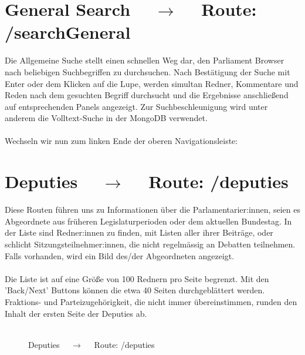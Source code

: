 \documentclass[10pt]{report}
\begin{document}
\section{General Search $\quad\rightarrow\quad$  Route:  /searchGeneral}
Die Allgemeine Suche stellt einen schnellen Weg dar, den Parliament Browser nach beliebigen Suchbegriffen zu durchsuchen. 
Nach Bestätigung der Suche mit Enter oder dem Klicken auf die Lupe, werden simultan Redner, Kommentare und Reden nach dem gesuchten Begriff durchsucht und die Ergebnisse anschließend auf entsprechenden Panels angezeigt.
Zur Suchbeschleunigung wird unter anderem die Volltext-Suche in der MongoDB verwendet.\\\\

\noindent Wechseln wir nun zum linken Ende der oberen Navigationsleiste:
\newpage

\section{Deputies $\quad\rightarrow\quad$  Route:  /deputies}
Diese Routen führen uns zu Informationen über die Parlamentarier:innen, seien es Abgeordnete aus früheren Legislaturperioden oder dem aktuellen Bundestag. In der Liste sind Redner:innen zu finden, mit Listen aller  ihrer Beiträge, oder schlicht Sitzungsteilnehmer:innen, die nicht regelmässig an Debatten teilnehmen. Falls vorhanden, wird ein Bild des/der Abgeordneten angezeigt.\\\\
Die Liste ist auf eine Größe von 100 Rednern pro Seite begrenzt. Mit den 'Back/Next' Buttons können die etwa 40 Seiten durchgeblättert werden.
Fraktions- und Parteizugehörigkeit, die nicht immer übereinstimmen, runden den Inhalt der ersten Seite der Deputies ab. \\\\


\begin{figure}[H]
	\begin{center}		
  	 \end{center}
	\caption{Deputies $\quad\rightarrow\quad$  Route:  /deputies}	
\end{figure}
\end{document}

